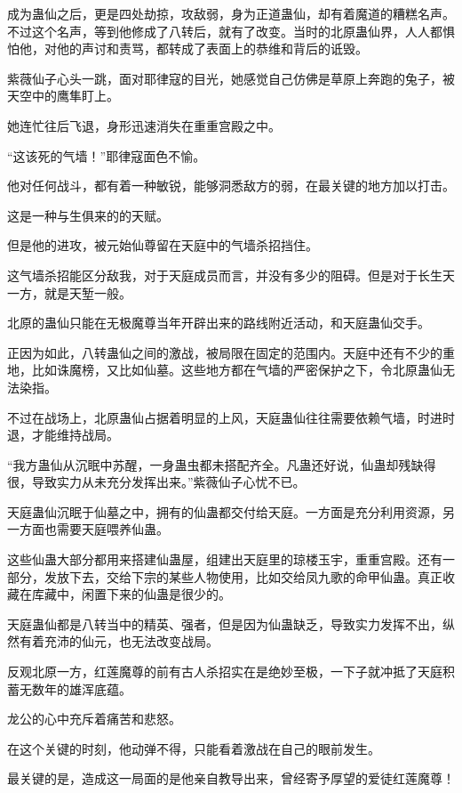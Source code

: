 \begin{this_body}
成为蛊仙之后，更是四处劫掠，攻敌弱，身为正道蛊仙，却有着魔道的糟糕名声。不过这个名声，等到他修成了八转后，就有了改变。当时的北原蛊仙界，人人都惧怕他，对他的声讨和责骂，都转成了表面上的恭维和背后的诋毁。

紫薇仙子心头一跳，面对耶律寇的目光，她感觉自己仿佛是草原上奔跑的兔子，被天空中的鹰隼盯上。

她连忙往后飞退，身形迅速消失在重重宫殿之中。

“这该死的气墙！”耶律寇面色不愉。

他对任何战斗，都有着一种敏锐，能够洞悉敌方的弱，在最关键的地方加以打击。

这是一种与生俱来的的天赋。

但是他的进攻，被元始仙尊留在天庭中的气墙杀招挡住。

这气墙杀招能区分敌我，对于天庭成员而言，并没有多少的阻碍。但是对于长生天一方，就是天堑一般。

北原的蛊仙只能在无极魔尊当年开辟出来的路线附近活动，和天庭蛊仙交手。

正因为如此，八转蛊仙之间的激战，被局限在固定的范围内。天庭中还有不少的重地，比如诛魔榜，又比如仙墓。这些地方都在气墙的严密保护之下，令北原蛊仙无法染指。

不过在战场上，北原蛊仙占据着明显的上风，天庭蛊仙往往需要依赖气墙，时进时退，才能维持战局。

“我方蛊仙从沉眠中苏醒，一身蛊虫都未搭配齐全。凡蛊还好说，仙蛊却残缺得很，导致实力从未充分发挥出来。”紫薇仙子心忧不已。

天庭蛊仙沉眠于仙墓之中，拥有的仙蛊都交付给天庭。一方面是充分利用资源，另一方面也需要天庭喂养仙蛊。

这些仙蛊大部分都用来搭建仙蛊屋，组建出天庭里的琼楼玉宇，重重宫殿。还有一部分，发放下去，交给下宗的某些人物使用，比如交给凤九歌的命甲仙蛊。真正收藏在库藏中，闲置下来的仙蛊是很少的。

天庭蛊仙都是八转当中的精英、强者，但是因为仙蛊缺乏，导致实力发挥不出，纵然有着充沛的仙元，也无法改变战局。

反观北原一方，红莲魔尊的前有古人杀招实在是绝妙至极，一下子就冲抵了天庭积蓄无数年的雄浑底蕴。

龙公的心中充斥着痛苦和悲怒。

在这个关键的时刻，他动弹不得，只能看着激战在自己的眼前发生。

最关键的是，造成这一局面的是他亲自教导出来，曾经寄予厚望的爱徒红莲魔尊！

\end{this_body}

